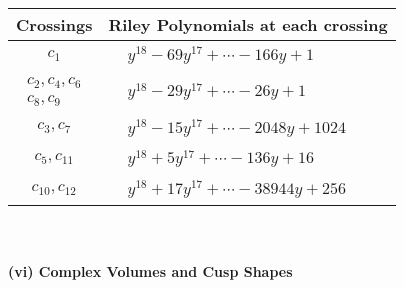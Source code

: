 \documentclass[1p]{elsarticle_modified}
\theoremstyle{definition}
\begin{document}
\begin{tabular}{m{50pt}|m{274pt}}
Crossings & \hspace{64pt}Riley Polynomials at each crossing \\
\hline $$\begin{aligned}c_{1}\end{aligned}$$&$\begin{aligned}
&y^{18}-69 y^{17}+\cdots-166 y+1
\end{aligned}$\\
\hline $$\begin{aligned}c_{2},c_{4},c_{6}\\c_{8},c_{9}\end{aligned}$$&$\begin{aligned}
&y^{18}-29 y^{17}+\cdots-26 y+1
\end{aligned}$\\
\hline $$\begin{aligned}c_{3},c_{7}\end{aligned}$$&$\begin{aligned}
&y^{18}-15 y^{17}+\cdots-2048 y+1024
\end{aligned}$\\
\hline $$\begin{aligned}c_{5},c_{11}\end{aligned}$$&$\begin{aligned}
&y^{18}+5 y^{17}+\cdots-136 y+16
\end{aligned}$\\
\hline $$\begin{aligned}c_{10},c_{12}\end{aligned}$$&$\begin{aligned}
&y^{18}+17 y^{17}+\cdots-38944 y+256
\end{aligned}$\\
\hline
\end{tabular}\\~\\
\newpage\flushleft \textbf{(vi) Complex Volumes and Cusp Shapes}
\end{document}
